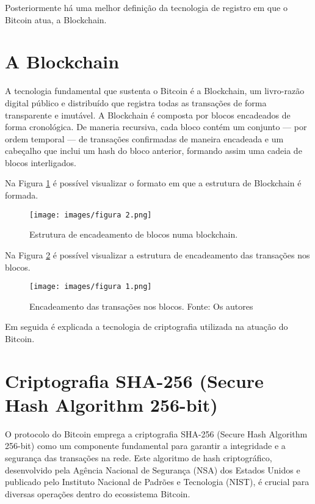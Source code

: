 Posteriormente há uma melhor definição da tecnologia de registro em que o Bitcoin atua, a Blockchain.

\section*{A Blockchain} \label{subsec:blockchain}
A tecnologia fundamental que sustenta o Bitcoin é a Blockchain, um livro-razão digital público e distribuído que registra todas as transações de forma transparente e imutável. A Blockchain é composta por blocos encadeados de forma cronológica. De maneria recursiva, cada bloco contém um conjunto — por ordem temporal — de transações confirmadas de maneira encadeada e um cabeçalho que inclui um hash do bloco anterior, formando assim uma cadeia de blocos interligados.

Na Figura \ref*{fig:blockchain} é possível visualizar o formato em que a estrutura de Blockchain é formada.

\begin{figure} [h]
    \centering
        \caption{Estrutura de encadeamento de blocos numa blockchain.}
        \texttt{[image: images/figura 2.png]}
        \label{fig:blockchain}
\end{figure}

Na Figura \ref*{fig:transactions} é possível visualizar a estrutura de encadeamento das transações nos blocos.

\begin{figure} [h]
    \centering
        \caption{Encadeamento das transações nos blocos. Fonte: Os autores}
        \texttt{[image: images/figura 1.png]}
        \label{fig:transactions}

\end{figure} 

Em seguida é explicada a tecnologia de criptografia utilizada na atuação do Bitcoin.

\section*{Criptografia SHA-256 (Secure Hash Algorithm 256-bit)} \label{subsec:sha256}
O protocolo do Bitcoin emprega a criptografia SHA-256 (Secure Hash Algorithm 256-bit) como um componente fundamental para garantir a integridade e a segurança das transações na rede. Este algoritmo de hash criptográfico, desenvolvido pela Agência Nacional de Segurança (NSA) dos Estados Unidos e publicado pelo Instituto Nacional de Padrões e Tecnologia (NIST), é crucial para diversas operações dentro do ecossistema Bitcoin. 

